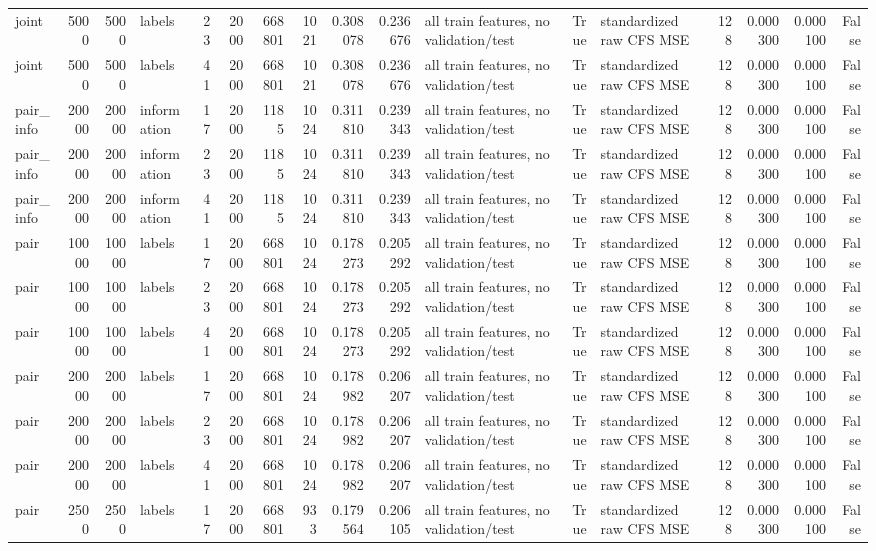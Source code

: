 \begin{tabular}{lrrlrrrrrrlrlrrrr}
joint & 5000 & 5000 & labels & 23 & 2000 & 668801 & 1021 & 0.308078 & 0.236676 & all train features, no validation/test & True & standardized raw CFS MSE & 128 & 0.000300 & 0.000100 & False \\
joint & 5000 & 5000 & labels & 41 & 2000 & 668801 & 1021 & 0.308078 & 0.236676 & all train features, no validation/test & True & standardized raw CFS MSE & 128 & 0.000300 & 0.000100 & False \\
pair_info & 20000 & 20000 & information & 17 & 2000 & 1185 & 1024 & 0.311810 & 0.239343 & all train features, no validation/test & True & standardized raw CFS MSE & 128 & 0.000300 & 0.000100 & False \\
pair_info & 20000 & 20000 & information & 23 & 2000 & 1185 & 1024 & 0.311810 & 0.239343 & all train features, no validation/test & True & standardized raw CFS MSE & 128 & 0.000300 & 0.000100 & False \\
pair_info & 20000 & 20000 & information & 41 & 2000 & 1185 & 1024 & 0.311810 & 0.239343 & all train features, no validation/test & True & standardized raw CFS MSE & 128 & 0.000300 & 0.000100 & False \\
pair & 10000 & 10000 & labels & 17 & 2000 & 668801 & 1024 & 0.178273 & 0.205292 & all train features, no validation/test & True & standardized raw CFS MSE & 128 & 0.000300 & 0.000100 & False \\
pair & 10000 & 10000 & labels & 23 & 2000 & 668801 & 1024 & 0.178273 & 0.205292 & all train features, no validation/test & True & standardized raw CFS MSE & 128 & 0.000300 & 0.000100 & False \\
pair & 10000 & 10000 & labels & 41 & 2000 & 668801 & 1024 & 0.178273 & 0.205292 & all train features, no validation/test & True & standardized raw CFS MSE & 128 & 0.000300 & 0.000100 & False \\
pair & 20000 & 20000 & labels & 17 & 2000 & 668801 & 1024 & 0.178982 & 0.206207 & all train features, no validation/test & True & standardized raw CFS MSE & 128 & 0.000300 & 0.000100 & False \\
pair & 20000 & 20000 & labels & 23 & 2000 & 668801 & 1024 & 0.178982 & 0.206207 & all train features, no validation/test & True & standardized raw CFS MSE & 128 & 0.000300 & 0.000100 & False \\
pair & 20000 & 20000 & labels & 41 & 2000 & 668801 & 1024 & 0.178982 & 0.206207 & all train features, no validation/test & True & standardized raw CFS MSE & 128 & 0.000300 & 0.000100 & False \\
pair & 2500 & 2500 & labels & 17 & 2000 & 668801 & 933 & 0.179564 & 0.206105 & all train features, no validation/test & True & standardized raw CFS MSE & 128 & 0.000300 & 0.000100 & False \\

\end{tabular}
